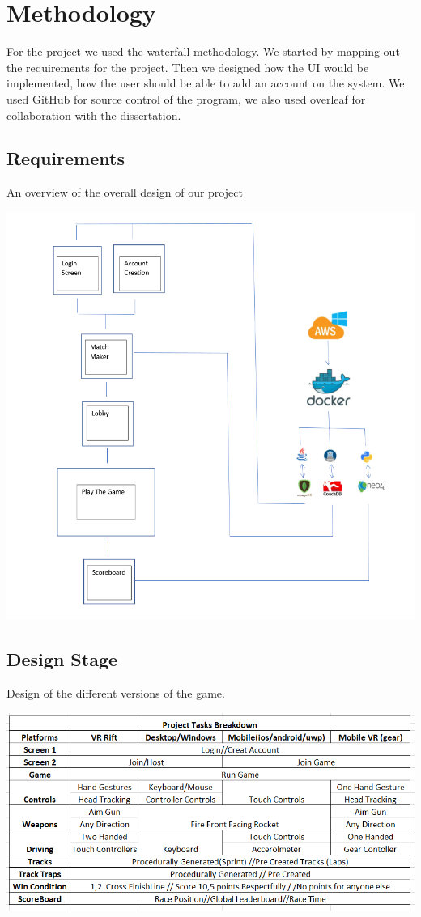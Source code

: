
\chapter{Methodology}
For the project we used the waterfall methodology. We started by mapping out the requirements for the project. Then we designed how the UI would be implemented, how the user should be able to add an account on the system.  We used GitHub for source control of the program, we also used overleaf for collaboration with the dissertation. 

\section{Requirements}

An overview of the overall design of our project

\includegraphics[width=1\columnwidth]{img/Overview.PNG}

\section{Design Stage}

Design of the different versions of the game.

\includegraphics[width=1\columnwidth]{img/breakdown.PNG}

